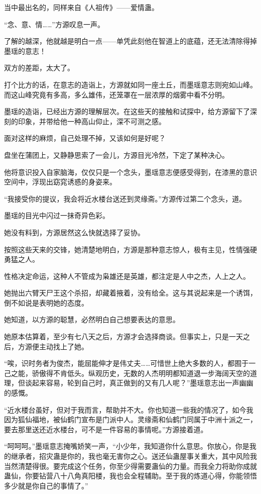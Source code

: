 \begin{this_body}
当中最出名的，同样来自《人祖传》——爱情蛊。

“念、意、情……”方源叹息一声。

了解的越深，他就越是明白一点——单凭此刻他在智道上的底蕴，还无法清除得掉墨瑶的意志！

双方的差距，太大了。

打个比方的话，在意志的造诣上，方源就如同一座土丘，而墨瑶意志则宛如山峰。而这山峰究竟有多高，多么雄伟，还笼罩在一层浓厚的烟雾中看不分明。

墨瑶的造诣，已经出方源的理解层次。在这些天的接触和试探中，给方源留下了深刻的印象，并带给他一种高山仰止，深不可测之感。

面对这样的麻烦，自己处理不掉，又该如何是好呢？

盘坐在蒲团上，又静静思索了一会儿，方源目光冷然，下定了某种决心。

他将意识投入自家脑海，仅仅只是一个念头，墨瑶意志便感受得到，在漆黑的意识空间中，浮现出窈窕诱惑的身姿来。

“我接受你的提议，我会将近水楼台送还到灵缘斋。”方源传过第二个念头，道。

墨瑶的目光中闪过一抹奇异色彩。

她没有料到，方源居然这么快就选择了妥协。

按照这些天来的交锋，她清楚地明白，方源是那种意志惊人，极有主见，性情强硬勇猛之人。

性格决定命运，这种人不管成为枭雄还是英雄，都注定是人中之杰，人上之人。

她抛出六臂天尸王这个杀招，却藏着掖着，没有给全。这与其说起来是一个诱饵，倒不如说是表明她的态度。

她知道，以方源的聪慧，必然明白自己想要表达的意思。

她原本估算着，至少有七八天之后，方源才会选择商谈。但事实上，只是一天之后，方源便主动找上了她。

“唉，识时务者为俊杰，能屈能伸才是伟丈夫……可惜世上绝大多数的人，都囿于一己之能，骄傲得不肯低头。纵观历史，无数的人杰明明都知道退一步海阔天空的道理，但谈起来容易，轮到自己时，真正做到的又有几人呢？”墨瑶意志出一声幽幽的感慨。

“近水楼台虽好，但对于我而言，帮助并不大。你也知道一些我的情况了，如今我因为狐仙福地，被仙鹤门宣布是门派中人。灵缘斋和仙鹤门同属于中洲十派之一，要去那里送还近水楼台，可不是一件容易的事情呢。”方源接着道。

“呵呵呵。”墨瑶意志掩嘴娇笑一声，“小少年，我知道你什么意思。你放心，你是我的继承者，招灾蛊是你的，我也毫无害你之心。送还仙蛊屋事关重大，其中风险我当然清楚得很。要完成这个任务，你至少得需要蛊仙的力量。而我全力将助你成就蛊仙，你要钻营八十八角真阳楼，我也会全程辅助。至于我的炼道心得，你能领悟多少就是你自己的事情了。”


\end{this_body}
